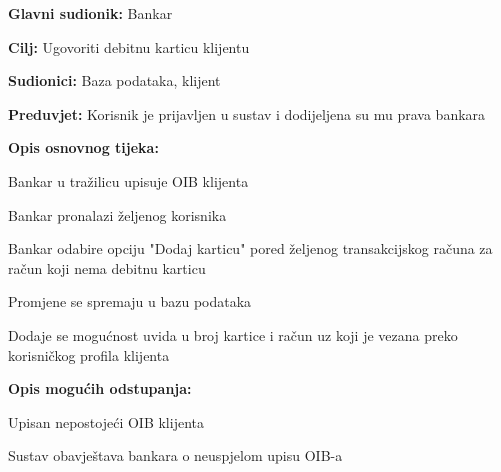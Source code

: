                 
                \noindent {}
                \begin{packed_item}
                
                  \item \textbf{Glavni sudionik: }Bankar
                  \item  \textbf{Cilj:} Ugovoriti debitnu karticu klijentu
                  \item  \textbf{Sudionici:} Baza podataka, klijent
                  \item  \textbf{Preduvjet:} Korisnik je prijavljen u sustav i dodijeljena su mu prava bankara
                  \item  \textbf{Opis osnovnog tijeka:}
                  
                  \item[] \begin{packed_enum}
                
                	\item Bankar u tražilicu upisuje OIB klijenta
                	\item Bankar pronalazi željenog korisnika
                    \item Bankar odabire opciju "Dodaj karticu" pored željenog transakcijskog računa za račun koji nema debitnu karticu
                    \item Promjene se spremaju u bazu podataka
                    \item Dodaje se mogućnost uvida u broj kartice i račun uz koji je vezana preko korisničkog profila klijenta            
                  \end{packed_enum}
                  
                  \item  \textbf{Opis mogućih odstupanja:}
                  
                  \item[] \begin{packed_item}
                
                        \item[1.a] Upisan nepostojeći OIB klijenta
                    \item[] \begin{packed_enum}
                      
                      \item Sustav obavještava bankara o neuspjelom upisu OIB-a
                      
                    \end{packed_enum}
                    
                  \end{packed_item}
                \end{packed_item}
                
